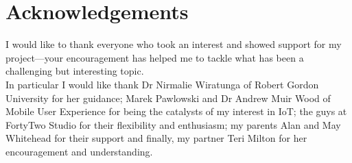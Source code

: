 \chapter{Acknowledgements}
  I would like to thank everyone who took an interest and showed support for my project---your encouragement has helped me to tackle what has been a challenging but interesting topic.\\

  \noindent In particular I would like thank Dr Nirmalie Wiratunga of Robert Gordon University for her guidance; Marek Pawlowski and Dr Andrew Muir Wood of Mobile User Experience for being the catalysts of my interest in IoT; the guys at FortyTwo Studio for their flexibility and enthusiasm; my parents Alan and May Whitehead for their support and finally, my partner Teri Milton for her encouragement and understanding.
